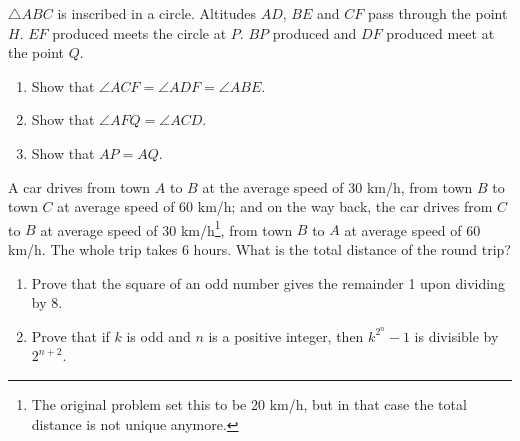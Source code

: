 \begin{problems}
    \problem $\triangle ABC$ is inscribed in a circle. Altitudes $AD$, $BE$ and
    $CF$ pass through the point $H$. $EF$ produced meets the circle at $P$.
    $BP$ produced and $DF$ produced meet at the point $Q$. 
    \begin{enumerate}
        \item Show that $\angle ACF = \angle ADF = \angle ABE$.
        
        \item Show that $\angle AFQ = \angle ACD$. 
        
        \item Show that $AP = AQ$. 
    \end{enumerate}
    
    \problem A car drives from town $A$ to $B$ at the average speed of 30 km/h,
    from town $B$ to town $C$ at average speed of 60 km/h; and on the way back,
    the car drives from $C$ to $B$ at average speed of 30 km/h\footnote{The
    original problem set this to be 20 km/h, but in that case the total
    distance is not unique anymore.}, from town $B$ to $A$ at average speed of 60
    km/h. The whole trip takes 6 hours. What is the total distance of the round
    trip?
    
    \problem 
    \begin{enumerate}
        \item Prove that the square of an odd number gives the remainder 1 upon
            dividing by 8. 
        
        \item Prove that if $k$ is odd and $n$ is a positive integer, then
            $k^{2^n} - 1$ is divisible by $2^{n + 2}$. 
    \end{enumerate}
\end{problems}
